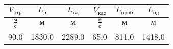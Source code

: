 \begin{tabular}{|c|c|c|c|c|c|}
\hline
$V_{отр}$ & $L_{р}$ & $L_{вд}$ & $V_{кас}$ & $L_{проб}$ & $L_{пд}$ \\ 
\hline
$\frac{м}{с}$ & $м$ & $м$ & $\frac{м}{с}$ & $м$ & $м$ \\ 
\hline
90.0 & 1830.0 & 2289.0 & 65.0 & 811.0 & 1418.0 \\ 
\hline
\end{tabular}